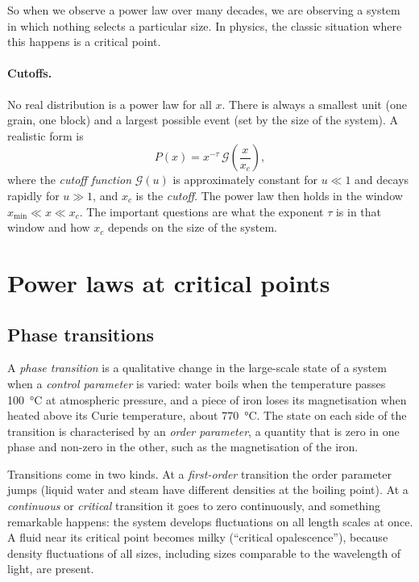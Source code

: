 So when we observe a power law over many decades, we are observing a system in which nothing selects a
particular size. In physics, the classic situation where this happens is a critical point.

\paragraph{Cutoffs.} No real distribution is a power law for all $x$. There is always a smallest unit (one
grain, one block) and a largest possible event (set by the size of the system). A realistic form is
\begin{equation}
  P(x) = x^{-\tau}\,\mathcal{G}\!\left(\frac{x}{x_c}\right),
  \label{eq:cutoff-form}
\end{equation}
where the \emph{cutoff function} $\mathcal G(u)$ is approximately constant for $u\ll1$ and decays rapidly
for $u\gg1$, and $x_c$ is the \emph{cutoff}. The power law then holds in the window $x_{\min}\ll x\ll x_c$.
The important questions are what the exponent $\tau$ is in that window and how $x_c$ depends on the size of
the system.

\section{Power laws at critical points}
\label{sec:critical}

\subsection{Phase transitions}

A \emph{phase transition} is a qualitative change in the large-scale state of a system when a
\emph{control parameter} is varied: water boils when the temperature passes \SI{100}{\celsius} at
atmospheric pressure, and a piece of iron loses its magnetisation when heated above its Curie temperature,
about \SI{770}{\celsius}. The state on each side of the transition is characterised by an \emph{order
parameter}, a quantity that is zero in one phase and non-zero in the other, such as the magnetisation of the
iron.

Transitions come in two kinds. At a \emph{first-order} transition the order parameter jumps (liquid water
and steam have different densities at the boiling point). At a \emph{continuous} or \emph{critical}
transition it goes to zero continuously, and something remarkable happens: the system develops fluctuations
on all length scales at once. A fluid near its critical point becomes milky (``critical opalescence''),
because density fluctuations of all sizes, including sizes comparable to the wavelength of light, are present.

